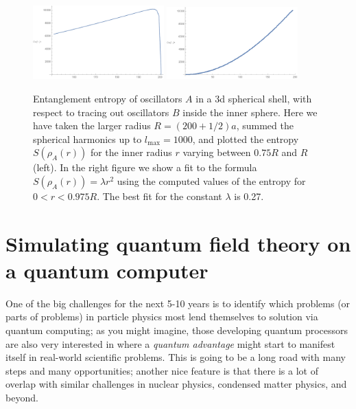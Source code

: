 \documentclass[a4paper,11pt]{article}
\begin{document}
%
\begin{figure}[tb]
\centering
\includegraphics[width=0.45\textwidth]{figs/area-1.pdf}
\includegraphics[width=0.45\textwidth]{figs/area-2.pdf}
\caption{Entanglement entropy of oscillators $A$ in a 3d spherical shell, with respect to tracing out oscillators $B$ inside the inner sphere.
Here we have taken the larger radius $R = (200 + 1/2)a$, summed the spherical harmonics up to $l_{\max} = 1000$, and plotted
the entropy $S(\rho_A(r))$ for the inner radius $r$ varying between $0.75 R$ and $R$ (left). In the right figure we show
a fit to the formula $S(\rho_A(r)) = \lambda r^2$ using the computed values of the entropy for $0 < r < 0.975 R$.
The best fit for the constant $\lambda$ is 0.27.   \label{fig:area}}
\end{figure}
%

\section{Simulating quantum field theory on a quantum computer}\label{sec:seven}

One of the big challenges for the next 5-10 years is to identify which problems (or parts of problems) in particle physics most lend themselves to
solution via quantum computing; as you might imagine, those developing quantum processors are also very interested in where a {\it quantum advantage}
might start to manifest itself in real-world scientific problems. This is going to be a long road with many steps and many opportunities; another nice feature
is that there is a lot of overlap with similar challenges in nuclear physics, condensed matter physics, and beyond.
\end{document}
